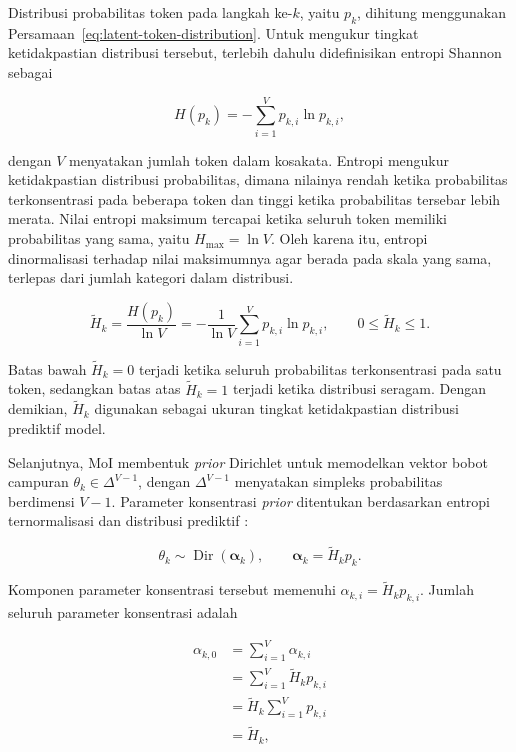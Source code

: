 Distribusi probabilitas token pada langkah ke-$k$, yaitu $p_k$, dihitung menggunakan Persamaan~\eqref{eq:latent-token-distribution}. Untuk mengukur tingkat ketidakpastian distribusi tersebut, terlebih dahulu didefinisikan entropi Shannon sebagai

\begin{equation}
H(p_k)
=
-\sum_{i=1}^{V}p_{k,i}\ln p_{k,i},
\label{eq:moi-shannon-entropy}
\end{equation}

dengan $V$ menyatakan jumlah token dalam kosakata. Entropi mengukur ketidakpastian distribusi probabilitas, dimana nilainya rendah ketika probabilitas terkonsentrasi pada beberapa token dan tinggi ketika probabilitas tersebar lebih merata. Nilai entropi maksimum tercapai ketika seluruh token memiliki probabilitas yang sama, yaitu $H_{\max}=\ln V$. Oleh karena itu, entropi dinormalisasi terhadap nilai maksimumnya agar berada pada skala yang sama, terlepas dari jumlah kategori dalam distribusi.

\begin{equation}
\widetilde H_k
=
\frac{H(p_k)}{\ln V}
=
-\frac{1}{\ln V}
\sum_{i=1}^{V}p_{k,i}\ln p_{k,i},
\qquad
0\leq \widetilde H_k\leq 1.
\label{eq:moi-normalized-entropy}
\end{equation}

Batas bawah $\widetilde H_k=0$ terjadi ketika seluruh probabilitas terkonsentrasi pada satu token, sedangkan batas atas $\widetilde H_k=1$ terjadi ketika distribusi seragam. Dengan demikian, $\widetilde H_k$ digunakan sebagai ukuran tingkat ketidakpastian distribusi prediktif model.

Selanjutnya, MoI membentuk \textit{prior} Dirichlet untuk memodelkan vektor bobot campuran $\theta_k\in\Delta^{V-1}$, dengan $\Delta^{V-1}$ menyatakan simpleks probabilitas berdimensi $V-1$. Parameter konsentrasi \textit{prior} ditentukan berdasarkan entropi ternormalisasi dan distribusi prediktif \citep{moi}:

\begin{equation}
\theta_k
\sim
\operatorname{Dir}(\boldsymbol{\alpha}_k),
\qquad
\boldsymbol{\alpha}_k
=
\widetilde H_k p_k.
\label{eq:moi-dirichlet-prior}
\end{equation}

Komponen parameter konsentrasi tersebut memenuhi $\alpha_{k,i}=\widetilde H_kp_{k,i}$. Jumlah seluruh parameter konsentrasi adalah

\begin{align}
\alpha_{k,0}
&=
\sum_{i=1}^{V}\alpha_{k,i} \\
&=
\sum_{i=1}^{V}\widetilde H_kp_{k,i} \\
&=
\widetilde H_k\sum_{i=1}^{V}p_{k,i} \\
&=
\widetilde H_k,
\label{eq:moi-total-concentration}
\end{align}

